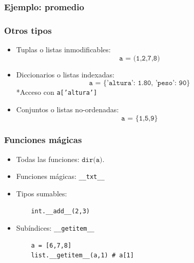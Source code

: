 \documentclass[14pt,aspectratio=169,xcolor=dvipsnames]{beamer}
\begin{document}
\begin{frame}\frametitle{Ejemplo: promedio}
\end{frame}
\begin{frame}\frametitle{Otros tipos}
    \begin{itemize}
        \item Tuplas o listas inmodificables: 
            $$  \texttt{a = (1,2,7,8)} $$
        \item Diccionarios o listas indexadas:
            $$ \texttt{a = \{'altura': 1.80, 'peso': 90\}} $$
            *Acceso con \texttt{a['altura']}
        \item Conjuntos o listas no-ordenadas: 
            $$ \texttt{a = \{1,5,9\}} $$
    \end{itemize}

\pause{}
\end{frame}
\begin{frame}[fragile]\frametitle{Funciones mágicas}

\begin{itemize}
    \item Todas las funciones: $\texttt{dir(a)}$.
    \item Funciones mágicas: \verb+__txt__+
    \item Tipos sumables: %
        \begin{verbatim}
    int.__add__(2,3)
        \end{verbatim}
    \item Subíndices: \verb+__getitem__+
        \begin{verbatim}
    a = [6,7,8]
    list.__getitem__(a,1) # a[1]
        \end{verbatim}
\end{itemize}

\vspace{2cm}
\end{frame}
\end{document}
